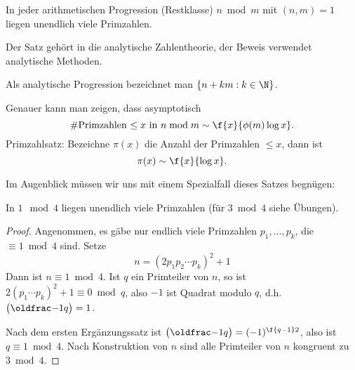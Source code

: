 \begin{st}[Dirichlet] \label{2.17}
	In jeder arithmetischen Progression (Restklasse) $n \bmod m$ mit $(n,m) = 1$ liegen unendlich viele Primzahlen.
	\begin{note}
		Der Satz gehört in die analytische Zahlentheorie, der Beweis verwendet analytische Methoden.

		Als analytische Progression bezeichnet man $\{n + km : k \in \N\}$.

		Genauer kann man zeigen, dass asymptotisch
		\[
			\# \text{Primzahlen $\le x$ in $n \bmod m$}
			\sim
			\f {x}{\phi(m) \log x}.
		\]
		Primzahlsatz: Bezeichne $\pi(x)$ die Anzahl der Primzahlen $\le x$, dann ist
		\[
			\pi(x) \sim \f{x}{\log x}.
		\]
	\end{note}
\end{st}

Im Augenblick müssen wir uns mit einem Spezialfall dieses Satzes begnügen:

In $1 \mod 4$ liegen unendlich viele Primzahlen (für $3 \bmod 4$ siehe Übungen).

\begin{proof}
	Angenommen, es gäbe nur endlich viele Primzahlen $p_1, \dotsc, p_k$, die $\equiv 1 \bmod 4$ sind.
	Setze
	\[
		n = (2 p_1 p_2 \dotsb p_k)^2 + 1
	\]
	Dann ist $n \equiv 1 \bmod 4$.
	Ist $q$ ein Primteiler von $n$, so ist $2(p_1\dotsb p_k)^2 + 1 \equiv 0 \bmod q$, also $-1$ ist Quadrat modulo $q$, d.h. $\legsym{-1}{q} = 1$.

	Nach dem ersten Ergänzungssatz ist $\legsym{-1}{q} = (-1)^{\f{q-1}2}$, also ist $q \equiv 1 \bmod 4$.
	Nach Konstruktion von $n$ sind alle Primteiler von $n$ kongruent zu $3 \bmod 4$.
\end{proof}

